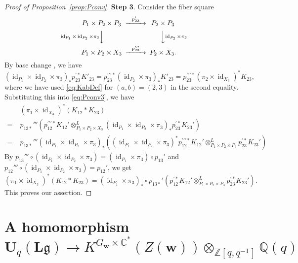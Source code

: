 \documentclass[12pt]{amsart}
\def\Bbb{\mathbb}
\theoremstyle{definition}
\theoremstyle{remark}
\numberwithin{equation}{subsection}
\newcommand{\propref}[1]{Proposition~\ref{#1}}
\newcommand{\C}{{\Bbb C}}
\newcommand{\Z}{{\Bbb Z}}
\newcommand{\Q}{{\Bbb Q}}
\newcommand{\id}{\operatorname{id}}
\newcommand{\bw}{{\mathbf w}} %
\newcommand{\Ul}{{\mathbf U}_q({\mathbf L}{\mathfrak g})} %
\newcommand{\Zw}{Z(\bw)}
\begin{document}
\begin{proof}[Proof of \propref{prop:Pconv}]
{\bf Step 3}. Consider the fiber square
\begin{equation*}
\begin{CD}
  P_1\times P_2\times P_3 @>{p_{23}'}>> P_2\times P_3\\
  @V{\id_{P_1}\times\id_{P_2}\times\pi_3}VV
  @VV{\id_{P_2}\times\pi_3}V \\
  P_1\times P_2\times X_3 @>{p_{23}'''}>> P_2\times X_3.
\end{CD}
\end{equation*}
By base change \cite[5.3.15]{Gi-book}, we have
\begin{equation*}
   (\id_{P_1}\times\id_{P_2}\times\pi_3)_* p_{23}^{\prime *}
   K'_{23} = p_{23}^{\prime\prime\prime*}
   (\id_{P_2}\times\pi_3)_* K'_{23}
   = p_{23}^{\prime\prime\prime*} (\pi_2\times\id_{X_3})^* K_{23},
\end{equation*}
where we have used \eqref{eq:KabDef} for $(a,b) = (2,3)$ in the
second equality.
Substituting this into \eqref{eq:Pconv3}, we have
\begin{equation*}
\begin{split}
  & (\pi_1\times\id_{X_3})^* (K_{12} * K_{23}) \\
  =\; & p_{13*}'''\left( p_{12}^{\prime\prime\prime*} K_{12}'
            \otimes^L_{P_1\times P_2\times X_3}
            (\id_{P_1}\times\id_{P_2}\times\pi_3)_* p_{23}^{\prime *}K_{23}'
            \right) \\
  =\; & p_{13*}''' (\id_{P_1}\times\id_{P_2}\times\pi_3)_*
  \left( (\id_{P_1}\times\id_{P_2}\times\pi_3)^*
            p_{12}^{\prime\prime\prime*} K_{12}'
            \otimes^L_{P_1\times P_2\times P_3}
            p_{23}^{\prime *} K_{23}'\right)
\end{split}
\end{equation*}
By $p_{13}'''\circ (\id_{P_1}\times\id_{P_2}\times\pi_3)
= (\id_{P_1}\times\pi_3)\circ p_{13}'$ and
$p_{12}'''\circ (\id_{P_1}\times\id_{P_2}\times\pi_3) = p_{12}'$, we get
\begin{equation*}
  (\pi_1\times\id_{X_3})^* (K_{12} * K_{23})
  = (\id_{P_1}\times\pi_3)_*\circ p_{13*}'\left(
    p_{12}^{\prime *} K_{12}'  \otimes^L_{P_1\times P_2\times P_3}
            p_{23}^{\prime *} K_{23}'\right).
\end{equation*}
This proves our assertion.
\end{proof}

\section{A homomorphism $\Ul\to
K^{G_\bw\times\C^*}(\Zw)\otimes_{\Z[q,q^{-1}]}\Q(q)$}\label{sec:hom}
\end{document}

